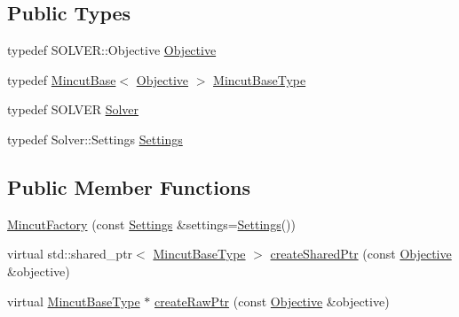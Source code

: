 \subsection*{Public Types}
\begin{DoxyCompactItemize}
\item 
typedef S\+O\+L\+V\+E\+R\+::\+Objective \hyperlink{classnifty_1_1graph_1_1optimization_1_1mincut_1_1MincutFactory_aafcaf92c8805a5a42a6ae396e18b4e4b}{Objective}
\item 
typedef \hyperlink{classnifty_1_1graph_1_1optimization_1_1mincut_1_1MincutBase}{Mincut\+Base}$<$ \hyperlink{classnifty_1_1graph_1_1optimization_1_1mincut_1_1MincutFactory_aafcaf92c8805a5a42a6ae396e18b4e4b}{Objective} $>$ \hyperlink{classnifty_1_1graph_1_1optimization_1_1mincut_1_1MincutFactory_a6dbcb07af12ecb377ee37a69bd408fd1}{Mincut\+Base\+Type}
\item 
typedef S\+O\+L\+V\+E\+R \hyperlink{classnifty_1_1graph_1_1optimization_1_1mincut_1_1MincutFactory_a7e1234a0d0f44be8ffbb850d71623602}{Solver}
\item 
typedef Solver\+::\+Settings \hyperlink{classnifty_1_1graph_1_1optimization_1_1mincut_1_1MincutFactory_acdeb5cb30d62974e38c02623732a5d19}{Settings}
\end{DoxyCompactItemize}
\subsection*{Public Member Functions}
\begin{DoxyCompactItemize}
\item 
\hyperlink{classnifty_1_1graph_1_1optimization_1_1mincut_1_1MincutFactory_a1a0b51c28038d110f34169e1eaf97158}{Mincut\+Factory} (const \hyperlink{classnifty_1_1graph_1_1optimization_1_1mincut_1_1MincutFactory_acdeb5cb30d62974e38c02623732a5d19}{Settings} \&settings=\hyperlink{classnifty_1_1graph_1_1optimization_1_1mincut_1_1MincutFactory_acdeb5cb30d62974e38c02623732a5d19}{Settings}())
\item 
virtual std\+::shared\+\_\+ptr$<$ \hyperlink{classnifty_1_1graph_1_1optimization_1_1mincut_1_1MincutFactory_a6dbcb07af12ecb377ee37a69bd408fd1}{Mincut\+Base\+Type} $>$ \hyperlink{classnifty_1_1graph_1_1optimization_1_1mincut_1_1MincutFactory_a316ece1ccb671de2cf96c105da3c6a98}{create\+Shared\+Ptr} (const \hyperlink{classnifty_1_1graph_1_1optimization_1_1mincut_1_1MincutFactory_aafcaf92c8805a5a42a6ae396e18b4e4b}{Objective} \&objective)
\item 
virtual \hyperlink{classnifty_1_1graph_1_1optimization_1_1mincut_1_1MincutFactory_a6dbcb07af12ecb377ee37a69bd408fd1}{Mincut\+Base\+Type} $\ast$ \hyperlink{classnifty_1_1graph_1_1optimization_1_1mincut_1_1MincutFactory_aaabb471ba31212b6f2e4c7db2bc9336c}{create\+Raw\+Ptr} (const \hyperlink{classnifty_1_1graph_1_1optimization_1_1mincut_1_1MincutFactory_aafcaf92c8805a5a42a6ae396e18b4e4b}{Objective} \&objective)
\end{DoxyCompactItemize}


